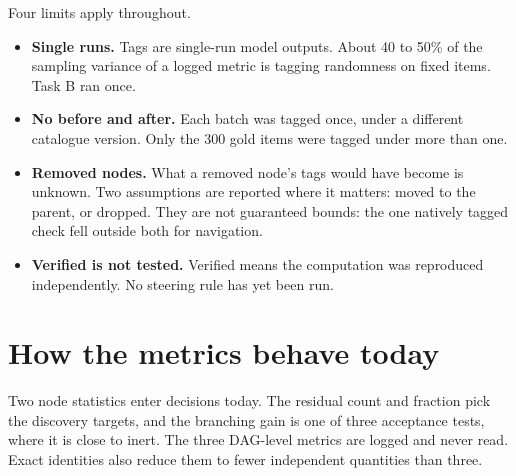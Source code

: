 \documentclass[10pt,a4paper]{article}
\begin{document}
Four limits apply throughout.
\begin{itemize}
\item \textbf{Single runs.} Tags are single-run model outputs. About 40 to 50\% of the sampling variance of a logged metric is tagging randomness on fixed items. Task B ran once.
\item \textbf{No before and after.} Each batch was tagged once, under a different catalogue version. Only the 300 gold items were tagged under more than one.
\item \textbf{Removed nodes.} What a removed node's tags would have become is unknown. Two assumptions are reported where it matters: moved to the parent, or dropped. They are not guaranteed bounds: the one natively tagged check fell outside both for navigation.
\item \textbf{Verified is not tested.} Verified means the computation was reproduced independently. No steering rule has yet been run.
\end{itemize}

\section{How the metrics behave today}

Two node statistics enter decisions today. The residual count and fraction pick the discovery targets, and the branching gain is one of three acceptance tests, where it is close to inert. The three DAG-level metrics are logged and never read. Exact identities also reduce them to fewer independent quantities than three.
\end{document}
